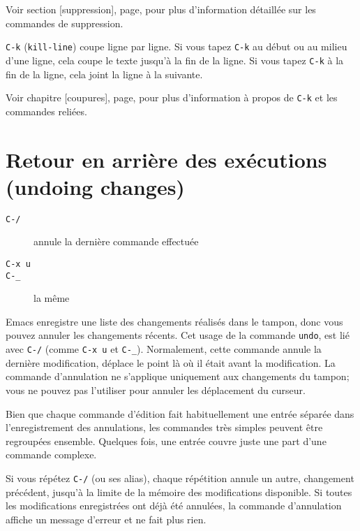 Voir section [suppression], page,
pour plus d'information détaillée sur les commandes de
suppression.\par

\texttt{C-k} (\texttt{kill-line}) coupe ligne par ligne. Si vous tapez
\texttt{C-k} au début ou au milieu d'une ligne, cela coupe le texte
jusqu'à la fin de la ligne. Si vous tapez \texttt{C-k} à la fin de la
ligne, cela joint la ligne à la suivante. \par

Voir chapitre [coupures], page, pour plus
d'information à propos de \texttt{C-k} et les commandes reliées.\par

\section{Retour en arrière des exécutions (undoing
  changes)} 

\begin{description}
\item[\texttt{C-/}] annule la dernière commande effectuée
\item[\texttt{C-x u}]
\item[\texttt{C-\_{}}] la même
\end{description}
Emacs enregistre une liste des changements réalisés dans le tampon,
donc vous pouvez annuler les changements récents. Cet usage de la
commande \texttt{undo}, est lié avec \texttt{C-/} (comme \texttt{C-x
  u} et \texttt{C-\_{}}). Normalement, cette commande annule la dernière
modification, déplace le point là où il était avant la
modification. La commande d'annulation ne s'applique uniquement aux
changements du tampon; vous ne pouvez pas l'utiliser pour annuler les
déplacement du curseur.\par

Bien que chaque commande d'édition fait habituellement une entrée
séparée dans l'enregistrement des annulations, les commandes très
simples peuvent être regroupées ensemble. Quelques fois, une entrée
couvre juste une part d'une commande complexe.\par 

Si vous répétez \texttt{C-/} (ou ses alias), chaque répétition annule
un autre, changement précédent, jusqu'à la limite de la mémoire des
modifications disponible. Si toutes les modifications enregistrées ont
déjà été annulées, la commande d'annulation affiche un message d'erreur
et ne fait plus rien.\par

